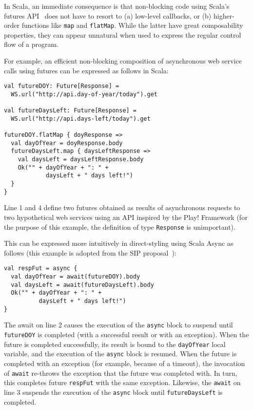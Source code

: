 \documentclass{acm_proc_article-sp}
\begin{document}
In Scala, an immediate consequence is that non-blocking code using Scala's
futures API~\cite{ScalaFuturesSIP} does not have to resort to (a) low-level
callbacks, or (b) higher-order functions like \verb|map| and \verb|flatMap|. While the
latter have great composability properties, they can appear unnatural when
used to express the regular control flow of a program.

For example, an efficient non-blocking composition of asynchronous web service
calls using futures can be expressed as follows in Scala:

\lstset{numbers=left,xleftmargin=2em}
\begin{lstlisting}
val futureDOY: Future[Response] =
  WS.url("http://api.day-of-year/today").get

val futureDaysLeft: Future[Response] =
  WS.url("http://api.days-left/today").get

futureDOY.flatMap { doyResponse =>
  val dayOfYear = doyResponse.body
  futureDaysLeft.map { daysLeftResponse =>
    val daysLeft = daysLeftResponse.body
    Ok("" + dayOfYear + ": " +
            daysLeft + " days left!")
  }
}
\end{lstlisting}

Line 1 and 4 define two futures obtained as results of asynchronous requests
to two hypothetical web services using an API inspired by the Play! Framework (for
the purpose of this example, the definition of type \verb|Response| is
unimportant).

This can be expressed more intuitively in direct-styling using Scala Async as
follows (this example is adopted from the SIP proposal~\cite{ScalaAsyncSIP}):

\begin{lstlisting}
val respFut = async {
  val dayOfYear = await(futureDOY).body
  val daysLeft = await(futureDaysLeft).body
  Ok("" + dayOfYear + ": " +
          daysLeft + " days left!")
}
\end{lstlisting}

The await on line 2 causes the execution of the \verb|async|
block to suspend until \verb|futureDOY| is completed (with a successful result
or with an exception). When the future is completed successfully, its result
is bound to the \verb|dayOfYear| local variable, and the execution of the
\verb|async| block is resumed. When the future is completed with an exception
(for example, because of a timeout), the invocation of \verb|await| re-throws
the exception that the future was completed with. In turn, this completes
future \verb|respFut| with the same exception. Likewise, the \verb|await| on
line 3 suspends the execution of the \verb|async| block until
\verb|futureDaysLeft| is completed.
\end{document}
